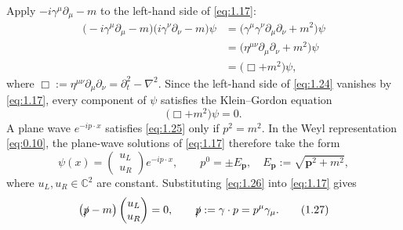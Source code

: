 \documentclass[11pt,a4paper]{article}
\newcommand{\topic}[1]{\par\addvspace{\medskipamount}\noindent{\bfseries\boldmath #1}\par\nopagebreak}
\begin{document}
Apply $-i\gamma^\mu\partial_\mu-m$ to the left-hand side of \eqref{eq:1.17}:
\begin{equation*}
\begin{aligned}
\bigl(-i\gamma^\mu\partial_\mu-m\bigr)\bigl(i\gamma^\nu\partial_\nu-m\bigr)\psi
&=\bigl(\gamma^\mu\gamma^\nu\partial_\mu\partial_\nu+m^2\bigr)\psi\\
&=\bigl(\eta^{\mu\nu}\partial_\mu\partial_\nu+m^2\bigr)\psi\\
&=\bigl(\Box+m^2\bigr)\psi,
\end{aligned}
\tag{1.24}\label{eq:1.24}
\end{equation*}
where $\Box:=\eta^{\mu\nu}\partial_\mu\partial_\nu=\partial_t^2-\nabla^2$. Since the left-hand side of \eqref{eq:1.24} vanishes by \eqref{eq:1.17}, every component of $\psi$ satisfies the Klein–Gordon equation
\begin{equation*}
\bigl(\Box+m^2\bigr)\psi=0.
\tag{1.25}\label{eq:1.25}
\end{equation*}
A plane wave $e^{-ip\cdot x}$ satisfies \eqref{eq:1.25} only if $p^2=m^2$. In the Weyl representation \eqref{eq:0.10}, the plane-wave solutions of \eqref{eq:1.17} therefore take the form
\begin{equation*}
\psi(x)=\begin{pmatrix}u_L\\u_R\end{pmatrix}e^{-ip\cdot x},
\qquad
p^0=\pm E_{\mathbf p},\quad
E_{\mathbf p}:=\sqrt{\mathbf p^2+m^2},
\tag{1.26}\label{eq:1.26}
\end{equation*}
where $u_L,u_R\in\mathbb C^2$ are constant. Substituting \eqref{eq:1.26} into \eqref{eq:1.17} gives
\begin{equation*}
\bigl(\slashed{p}-m\bigr)\begin{pmatrix}u_L\\u_R\end{pmatrix}=0,
\qquad
\slashed{p}:=\gamma\cdot p=p^\mu\gamma_\mu.
\tag{1.27}\label{eq:1.27}
\end{equation*}

\topic{(1) Rest Frame}
\end{document}
